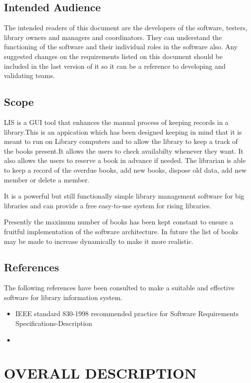 \documentclass{article}
\begin{document}
\subsection{Intended Audience}
The intended readers of this document are the developers of the software, testers, library owners
and managers and coordinators.
They can understand the functioning of the software and their individual roles in the software also.
Any suggested changes on the requirements listed on this document should be included in
the last version of it so it can be a reference to developing and validating teams.
\subsection{Scope}
LIS is a GUI tool that enhances the manual process of keeping records in a library.This is an appication which has been designed keeping in mind that it is meant to run on Library computers and to allow the library to keep a track of the books present.It allows the users to check availabilty whenever they want. It also allows the users to reserve a book in advance if needed. The librarian is able to keep a record of the overdue books, add new books, dispose old data, add new member or delete a member. 

It is a powerful but still functionally simple library management software for big libraries and can provide a free easy-to-use system for rising libraries.

Presently the maximum number of books has been kept constant to ensure a fruitful implementation of the software architecture. In future the list of books may be made to increase dynamically to make it more realistic.
\subsection{References}
The following references have been consulted to make a suitable and effective software for library information system.

\begin{itemize}
\item IEEE standard 830-1998 recommended practice for Software Requirements Specifications-Description
\item 
\end{itemize}


\section{OVERALL DESCRIPTION}
\end{document}
